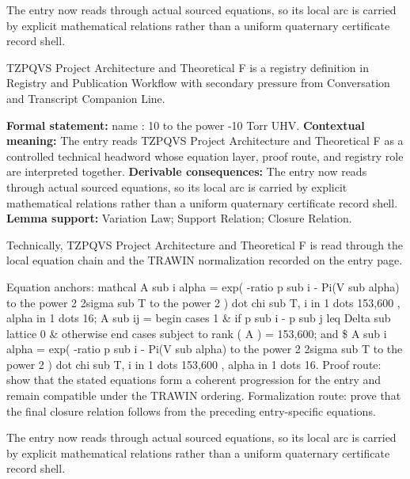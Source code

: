 The entry now reads through actual sourced equations, so its local arc is carried by explicit mathematical relations rather than a uniform quaternary certificate record shell.
\clearpage


\begingroup\small
{}
TZPQVS Project Architecture and Theoretical F is a registry definition in Registry and Publication Workflow with secondary pressure from Conversation and Transcript Companion Line.

\begingroup\footnotesize\setlength{\emergencystretch}{3em}\sloppy
\textbf{Formal statement:} name : 10 to the power -10 Torr UHV. \textbf{Contextual meaning:} The entry reads TZPQVS Project Architecture and Theoretical F as a controlled technical headword whose equation layer, proof route, and registry role are interpreted together. \textbf{Derivable consequences:} The entry now reads through actual sourced equations, so its local arc is carried by explicit mathematical relations rather than a uniform quaternary certificate record shell. \textbf{Lemma support:} Variation Law; Support Relation; Closure Relation.\par
\endgroup

Technically, TZPQVS Project Architecture and Theoretical F is read through the local equation chain and the TRAWIN normalization recorded on the entry page.

Equation anchors: mathcal A sub i alpha = exp( -ratio p sub i - Pi(V sub alpha) to the power 2 2sigma sub T to the power 2 ) dot chi sub T, i in 1 dots 153,600 , alpha in 1 dots 16; A sub ij = begin cases 1 \& if p sub i - p sub j leq Delta sub lattice 0 \& otherwise end cases subject to rank ( A ) = 153,600; and \$ A sub i alpha = exp( -ratio p sub i - Pi(V sub alpha) to the power 2 2sigma sub T to the power 2 ) dot chi sub T, i in 1 dots 153,600 , alpha in 1 dots 16. Proof route: show that the stated equations form a coherent progression for the entry and remain compatible under the TRAWIN ordering. Formalization route: prove that the final closure relation follows from the preceding entry-specific equations.

The entry now reads through actual sourced equations, so its local arc is carried by explicit mathematical relations rather than a uniform quaternary certificate record shell.
\endgroup

